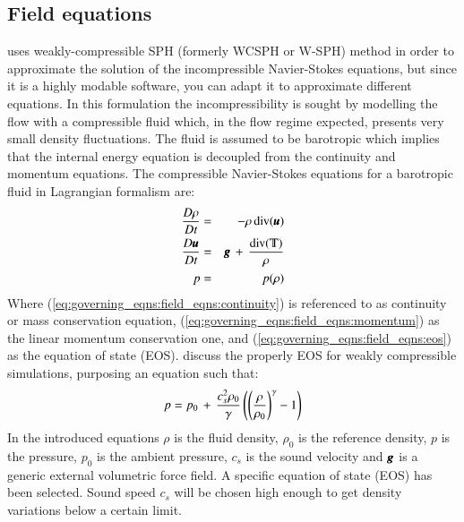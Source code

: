 \subsection{Field equations}
%
\NAME uses weakly-compressible SPH (formerly WCSPH or W-SPH) method in
order to approximate the solution of the incompressible Navier-Stokes
equations, but since it is a highly modable software, you can adapt it to
approximate different equations. In this formulation the incompressibility
is sought by modelling the flow with a compressible fluid which, in
the flow regime expected, presents very small density fluctuations.
The fluid is assumed to be barotropic which implies that the internal energy
equation is decoupled from the continuity and momentum equations.\rc
%
The compressible Navier-Stokes equations for a barotropic fluid in Lagrangian
formalism are:
%
\begin{eqnarray}
	\label{eq:governing_eqns:field_eqns:continuity}
	\dsty{\frac{D \rho}{D t}} & = & -\rho \, \divergence(\bs{u}) \vspace{0.3cm} \\
	\label{eq:governing_eqns:field_eqns:momentum}
	\dsty{\frac{D \bs{u}}{D t}} & = & \bs{g} \, + \, \dsty{\frac{\divergence(\varmathbb{T})}{\rho}}
	\vspace{0.3cm} \\
	\label{eq:governing_eqns:field_eqns:eos}
	p & = & p(\rho)
\end{eqnarray}
%
Where (\ref{eq:governing_eqns:field_eqns:continuity}) is referenced to as
continuity or mass conservation equation,
(\ref{eq:governing_eqns:field_eqns:momentum}) as the linear momentum
conservation one, and (\ref{eq:governing_eqns:field_eqns:eos}) as the equation
of state (EOS).\rc
%
\citet{monaghan_arfm_2012} discuss the properly EOS for weakly compressible
simulations, purposing an equation such that:
%
\begin{eqnarray}
\label{eq:governing_eqns:field_eqns:eos:arfm_2012}
p  =  p_0 \, + \, \displaystyle{\frac{c_s^2 \rho_0}{\gamma}} \left( \left( \displaystyle{\frac{\rho}{\rho_0}} \right)^{\gamma} - 1 \right)
\end{eqnarray}
%
In the introduced equations $\rho$ is the fluid density, $\rho_0$ is the
reference density, $p$ is the pressure, $p_0$ is the ambient pressure, $c_s$ is
the sound velocity and $\pmb{g}$ is a generic external volumetric force field. A
specific equation of state (EOS) has been selected. Sound speed $c_s$ will be
chosen high enough to get density variations below a certain limit.\rc

